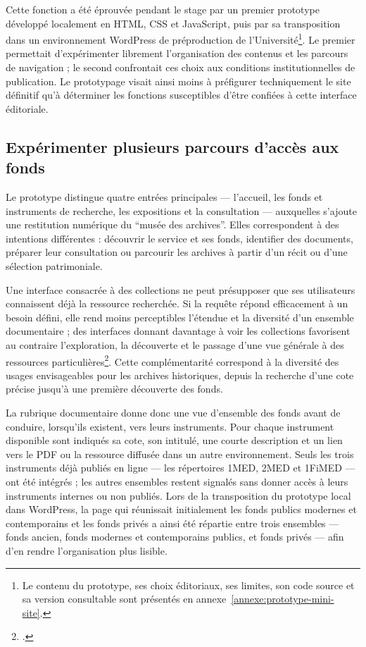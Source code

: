 Cette fonction a été éprouvée pendant le stage par un premier prototype développé localement en HTML, CSS et JavaScript, puis par sa transposition dans un environnement WordPress de préproduction de l'Université\footnote{Le contenu du prototype, ses choix éditoriaux, ses limites, son code source et sa version consultable sont présentés en annexe~\ref{annexe:prototype-mini-site}.}. Le premier permettait d'expérimenter librement l'organisation des contenus et les parcours de navigation ; le second confrontait ces choix aux conditions institutionnelles de publication. Le prototypage visait ainsi moins à préfigurer techniquement le site définitif qu'à déterminer les fonctions susceptibles d'être confiées à cette interface éditoriale.

\subsection{Expérimenter plusieurs parcours d'accès aux fonds}

Le prototype distingue quatre entrées principales --- l'accueil, les fonds et instruments de recherche, les expositions et la consultation --- auxquelles s'ajoute une restitution numérique du \enquote{musée des archives}. Elles correspondent à des intentions différentes : découvrir le service et ses fonds, identifier des documents, préparer leur consultation ou parcourir les archives à partir d'un récit ou d'une sélection patrimoniale.

Une interface consacrée à des collections ne peut présupposer que ses utilisateurs connaissent déjà la ressource recherchée. Si la requête répond efficacement à un besoin défini, elle rend moins perceptibles l'étendue et la diversité d'un ensemble documentaire ; des interfaces donnant davantage à voir les collections favorisent au contraire l'exploration, la découverte et le passage d'une vue générale à des ressources particulières\footcite{Whitelaw2015GenerousInterfaces}. Cette complémentarité correspond à la diversité des usages envisageables pour les archives historiques, depuis la recherche d'une cote précise jusqu'à une première découverte des fonds.

La rubrique documentaire donne donc une vue d'ensemble des fonds avant de conduire, lorsqu'ils existent, vers leurs instruments. Pour chaque instrument disponible sont indiqués sa cote, son intitulé, une courte description et un lien vers le PDF ou la ressource diffusée dans un autre environnement. Seuls les trois instruments déjà publiés en ligne --- les répertoires 1MED, 2MED et 1FiMED --- ont été intégrés ; les autres ensembles restent signalés sans donner accès à leurs instruments internes ou non publiés. Lors de la transposition du prototype local dans WordPress, la page qui réunissait initialement les fonds publics modernes et contemporains et les fonds privés a ainsi été répartie entre trois ensembles --- fonds ancien, fonds modernes et contemporains publics, et fonds privés --- afin d'en rendre l'organisation plus lisible.

